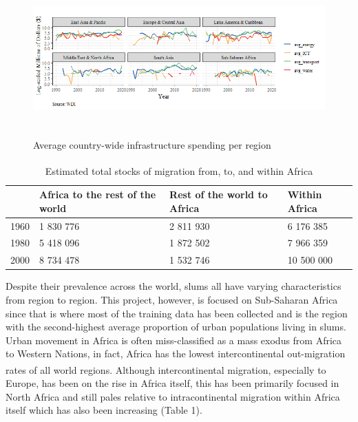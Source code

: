 \begin{figure}
    \centering
    \includegraphics[height = 6cm]{Graphics/Average country-wide infrastructure spending per region.png}
    \caption{Average country-wide infrastructure spending per region}
    \label{fig:Infraspending}
\end{figure}

\begin{table}[ht]
\centering
\caption{Estimated total stocks of migration from, to, and within Africa\textsuperscript{{\cite{WBGBMD}}}}
\begin{tabular}{rlll}
  \hline \hline 
 & Africa to the rest of the world & Rest of the world to Africa & Within Africa\\ 
  \hline
1960 & 1 830 776 & 2 811 930 & 6 176 385 \\ 
1980 & 5 418 096 & 1 872 502 & 7 966 359  \\ 
2000 & 8 734 478 & 1 532 746 & 10 500 000  \\ 
   \hline
\end{tabular}
\end{table}

Despite their prevalence across the world, slums all have varying characteristics from region to region. This project, however, is focused on Sub-Saharan Africa since that is where most of the training data has been collected and is the region with the second-highest average proportion of urban populations living in slums. Urban movement in Africa is often miss-classified as a mass exodus from Africa to Western Nations, in fact, Africa has the lowest intercontinental out-migration rates of all world regions\textsuperscript{\cite{Teye}}. Although intercontinental migration, especially to Europe, has been on the rise in Africa itself, this has been primarily focused in North Africa and still pales relative to intracontinental migration within Africa itself which has also been increasing (Table 1). 


